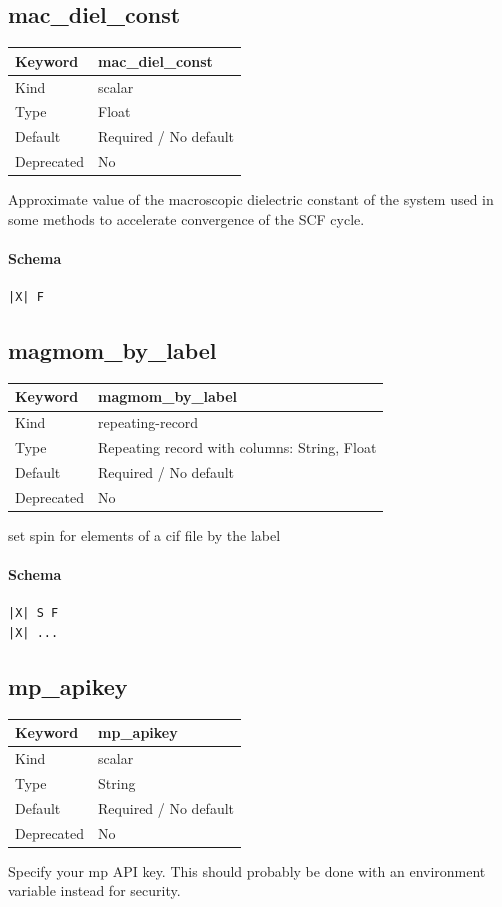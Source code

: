 \documentclass[11pt]{article}
\begin{document}
{{{{{\subsection{mac\_diel\_const}
\label{kw:mac-diel-const}
\begin{longtable}{|p{1.5in}|p{4.5in}|}
\hline
Keyword & mac\_diel\_const \\
\hline
Kind & scalar \\
\hline
Type & Float \\
\hline
Default & Required / No default \\
\hline
Deprecated & No \\
\hline
\end{longtable}
 Approximate value of the macroscopic dielectric constant of the system used in
 some methods to accelerate convergence of the SCF cycle.

\paragraph{Schema}
\begin{Verbatim}
|X| F
\end{Verbatim}

\subsection{magmom\_by\_label}
\label{kw:magmom-by-label}
\begin{longtable}{|p{1.5in}|p{4.5in}|}
\hline
Keyword & magmom\_by\_label \\
\hline
Kind & repeating-record \\
\hline
Type & Repeating record with columns: String, Float \\
\hline
Default & Required / No default \\
\hline
Deprecated & No \\
\hline
\end{longtable}
 set spin for elements of a cif file by the label

\paragraph{Schema}
\begin{Verbatim}
|X| S F
|X| ...
\end{Verbatim}

\subsection{mp\_apikey}
\label{kw:mp-apikey}
\begin{longtable}{|p{1.5in}|p{4.5in}|}
\hline
Keyword & mp\_apikey \\
\hline
Kind & scalar \\
\hline
Type & String \\
\hline
Default & Required / No default \\
\hline
Deprecated & No \\
\hline
\end{longtable}
 Specify your mp API key. This should probably be done with an environment variable instead for security.

}}}}}
\end{document}

